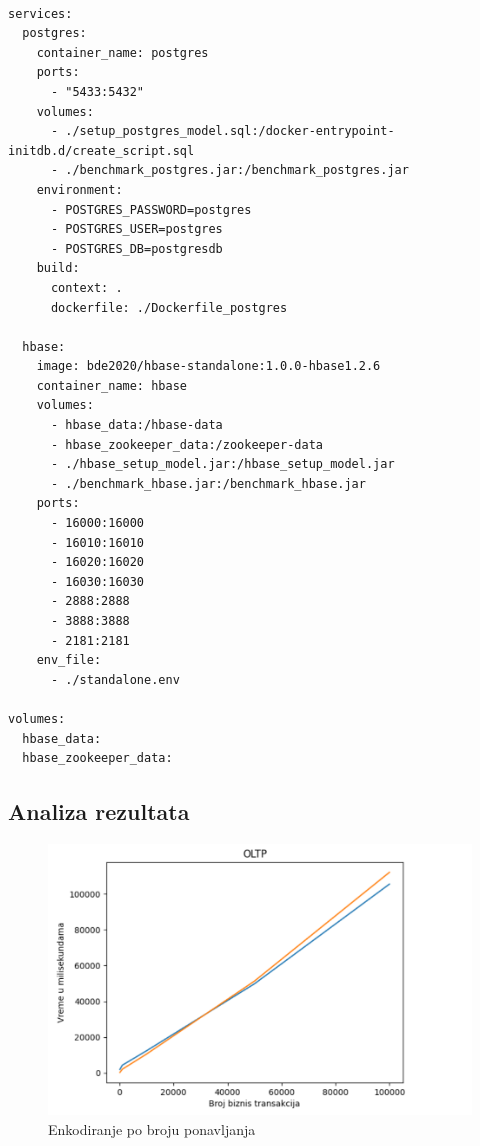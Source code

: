 \documentclass[12pt,oneside]{memoir}
\begin{document}
\begin{lstlisting}[title={prepareEnv.sh},captionpos=t]

services: 
  postgres:
    container_name: postgres
    ports:
      - "5433:5432"
    volumes:
      - ./setup_postgres_model.sql:/docker-entrypoint-initdb.d/create_script.sql
      - ./benchmark_postgres.jar:/benchmark_postgres.jar
    environment:
      - POSTGRES_PASSWORD=postgres
      - POSTGRES_USER=postgres
      - POSTGRES_DB=postgresdb
    build:
      context: .
      dockerfile: ./Dockerfile_postgres

  hbase:
    image: bde2020/hbase-standalone:1.0.0-hbase1.2.6
    container_name: hbase
    volumes:
      - hbase_data:/hbase-data
      - hbase_zookeeper_data:/zookeeper-data
      - ./hbase_setup_model.jar:/hbase_setup_model.jar
      - ./benchmark_hbase.jar:/benchmark_hbase.jar
    ports:
      - 16000:16000
      - 16010:16010
      - 16020:16020
      - 16030:16030
      - 2888:2888
      - 3888:3888
      - 2181:2181
    env_file:
      - ./standalone.env

volumes:
  hbase_data:
  hbase_zookeeper_data:
\end{lstlisting}


\subsection{Analiza rezultata}

\begin{figure}[!ht]
  \centering
  \includegraphics[width=1\textwidth]{oltp-vizualization.png}
  \caption{Enkodiranje po broju ponavljanja}
  \label{fig:grafikon}
\end{figure}
\end{document}
